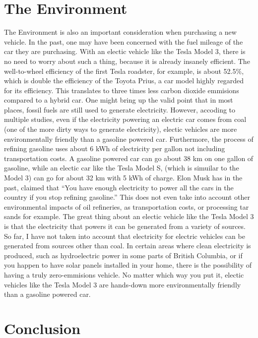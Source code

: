 \documentclass{article}
\begin{document}
  \section{The Environment}
  The Environment is also an important consideration when purchasing a new vehicle.
  In the past, one may have been concerned with the fuel mileage of the car they are purchasing.
  With an electic vehicle like the Tesla Model 3, there is no need to worry about such a thing,
  because it is already insanely efficient. The well-to-wheel efficiency of the first Tesla roadster,
  for example, is about 52.5\%, which is double the efficiency of the Toyota Prius\cite{eberhard200621},
  a car model highly regarded for its efficiency. This translates to three times less carbon dioxide
  emmisions compared to a hybrid car.\cite{eberhard200621} One might bring up the valid point that
  in most places, fossil fuels are still used to generate electricity. However, accoding to multiple
  studies, even if the electricity powering an electric car comes from coal
  (one of the more dirty ways to generate electricity),
  electic vehicles are more environmentally friendly than a gasoline powered car.\cite{cleanerevenwithcoal}
  Furthermore, the process of refining gasoline uses about 6 kWh of electricity per gallon not including transportation costs.
  A gasoline powered car can go about 38 km on one gallon of gasoline, while an electic car like the Tesla Model S,
  (which is simuilar to the Model 3) can go for about 32 km with 5 kWh of charge. Elon Musk has
  in the past, claimed that ``You have enough electricity to power all the cars
  in the country if you stop refining gasoline.''\cite{rosoff_elon_nodate}
  This does not even take into account other environmental impacts of oil refineries,
  as transportation costs, or processing tar sands for example.\cite{6kwh}
  The great thing about an electic vehicle like the Tesla Model 3 is that
  the electricity that powers it can be generated from a variety of sources.\cite{eberhard200621}
  So far, I have not taken into account that electricity for electric vehicles can be generated
  from sources other than coal. In certain areas where clean electricity is produced, such
  as hydroelectric power in some parts of British Columbia, or if you happen to have solar
  panels installed in your home, there is the possibility of having a truly zero-emmisions vehicle.
  No matter which way you put it, electic vehicles like the Tesla Model 3 are hands-down
  more environmentally friendly than a gasoline powered car.

  \section{Conclusion}
  \blindtext{}\blindtext{}


\end{document}
